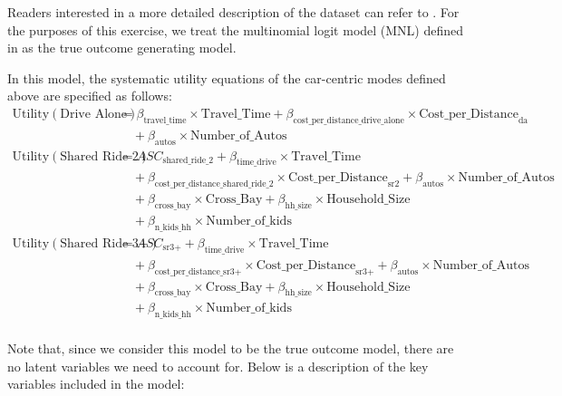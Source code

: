 Readers interested in a more detailed description of the dataset can refer to \citet{brathwaite_asymmetric}.
For the purposes of this exercise, we treat the multinomial logit model (MNL) defined in \citet{brathwaite_asymmetric} as the true outcome generating model.

In this model, the systematic utility equations of the car-centric modes defined above are specified as follows:
\begin{equation*}
   \begin{aligned}
   \textrm{Utility} \left(\textrm{Drive Alone}\right) &= \beta_{\textrm{travel\_time}} \times \textrm{Travel\_Time} + \beta_{\textrm{cost\_per\_distance\_drive\_alone}} \times \textrm{Cost\_per\_Distance}_{\textrm{da}} \\
   &\quad + \beta_{\textrm{autos}} \times \textrm{Number\_of\_Autos} \\
   \textrm{Utility} \left(\textrm{Shared Ride 2}\right) &= ASC_{\textrm{shared\_ride\_2}} + \beta_{\textrm{time\_drive}} \times \textrm{Travel\_Time} \\
   &\quad + \beta_{\textrm{cost\_per\_distance\_shared\_ride\_2}} \times \textrm{Cost\_per\_Distance}_{ \textrm{sr2} } + \beta_{\textrm{autos}}  \times \textrm{Number\_of\_Autos} \\
   &\quad + \beta_{\textrm{cross\_bay}} \times \textrm{Cross\_Bay} + \beta_{\textrm{hh\_size}} \times \textrm{Household\_Size} \\
   &\quad + \beta_{\textrm{n\_kids\_hh}} \times \textrm{Number\_of\_kids} \\
   \textrm{Utility} \left(\textrm{Shared Ride 3+}\right) &= ASC_{\textrm{sr3+}} + \beta_{\textrm{time\_drive}} \times \textrm{Travel\_Time} \\
   &\quad + \beta_{\textrm{cost\_per\_distance\_sr3+}} \times \textrm{Cost\_per\_Distance}_{\textrm{sr3+}} + \beta_{\textrm{autos}}  \times \textrm{Number\_of\_Autos} \\
   &\quad + \beta_{\textrm{cross\_bay}} \times \textrm{Cross\_Bay} + \beta_{\textrm{hh\_size}} \times \textrm{Household\_Size} \\
   &\quad + \beta_{\textrm{n\_kids\_hh}} \times \textrm{Number\_of\_kids} \\
   \end{aligned}
\end{equation*}

Note that, since we consider this model to be the true outcome model, there are no latent variables we need to account for.
Below is a description of the key variables included in the model:


